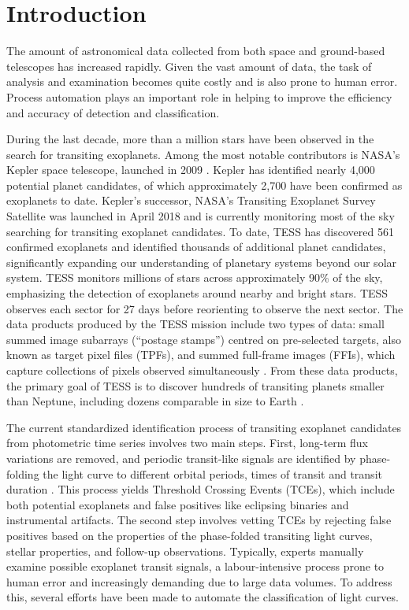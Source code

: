 \section{Introduction}

The amount of astronomical data collected from both space and ground-based telescopes has increased rapidly. Given the vast amount of data, the task of analysis and examination becomes quite costly and is also prone to human error. Process automation plays an important role in helping to improve the efficiency and accuracy of detection and classification. \par


During the last decade, more than a million stars have been observed in the search for transiting exoplanets. Among the most notable contributors is NASA’s Kepler space telescope, launched in 2009 \citep{borucki2010kepler}. Kepler has identified nearly 4,000 potential planet candidates, of which approximately 2,700 have been confirmed as exoplanets to date. Kepler's successor, NASA's Transiting Exoplanet Survey Satellite \citep[TESS;][]{ricker2014transiting} was launched in April 2018 and is currently monitoring most of the sky searching for transiting exoplanet candidates. To date, TESS has discovered 561 confirmed exoplanets and identified thousands of additional planet candidates, significantly expanding our understanding of planetary systems beyond our solar system. TESS monitors millions of stars across approximately 90\% of the sky, emphasizing the detection of exoplanets around nearby and bright stars. TESS observes each sector for \approximately{}27 days before reorienting to observe the next sector. The data products produced by the TESS mission include two types of data: small summed image subarrays (``postage stamps'') centred on pre-selected targets, also known as target pixel files (TPFs), and summed full-frame images (FFIs), which capture collections of pixels observed simultaneously \citep{guerrero2021tess}. From these data products, the primary goal of TESS is to discover hundreds of transiting planets smaller than Neptune, including dozens comparable in size to Earth \citep{Ricker:2015}. \par


The current standardized identification process of transiting exoplanet candidates from photometric time series involves two main steps. First, long-term flux variations are removed, and periodic transit-like signals are identified by phase-folding the light curve to different orbital periods, times of transit and transit duration \citep[e.g.][]{tenenbaum:2012}. This process yields Threshold Crossing Events (TCEs), which include both potential exoplanets and false positives like eclipsing binaries and instrumental artifacts. The second step involves vetting TCEs by rejecting false positives based on the properties of the phase-folded transiting light curves, stellar properties, and follow-up observations. Typically, experts manually examine possible exoplanet transit signals, a labour-intensive process prone to human error and increasingly demanding due to large data volumes. To address this, several efforts have been made to automate the classification of light curves. \par


